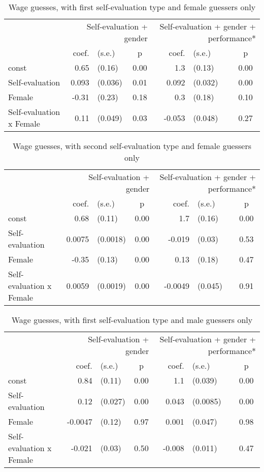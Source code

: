 \begin{table}
\centering
\caption{Wage guesses, with first self-evaluation type and female guessers only}
\begin{tabular}{lrlc|rlc}
\toprule
 & \multicolumn{3}{p{12em}}{Self-evaluation + gender} & \multicolumn{3}{p{12em}}{Self-evaluation + gender + performance*} \\
 & coef. & (s.e.) & p & coef. & (s.e.) & p \\
\midrule
const & 0.65 & (0.16) & 0.00 & 1.3 & (0.13) & 0.00 \\
Self-evaluation & 0.093 & (0.036) & 0.01 & 0.092 & (0.032) & 0.00 \\
Female & -0.31 & (0.23) & 0.18 & 0.3 & (0.18) & 0.10 \\
Self-evaluation x Female & 0.11 & (0.049) & 0.03 & -0.053 & (0.048) & 0.27 \\
\bottomrule
\end{tabular}
\end{table}

\begin{table}
\centering
\caption{Wage guesses, with second self-evaluation type and female guessers only}
\begin{tabular}{lrlc|rlc}
\toprule
 & \multicolumn{3}{p{12em}}{Self-evaluation + gender} & \multicolumn{3}{p{12em}}{Self-evaluation + gender + performance*} \\
 & coef. & (s.e.) & p & coef. & (s.e.) & p \\
\midrule
const & 0.68 & (0.11) & 0.00 & 1.7 & (0.16) & 0.00 \\
Self-evaluation & 0.0075 & (0.0018) & 0.00 & -0.019 & (0.03) & 0.53 \\
Female & -0.35 & (0.13) & 0.00 & 0.13 & (0.18) & 0.47 \\
Self-evaluation x Female & 0.0059 & (0.0019) & 0.00 & -0.0049 & (0.045) & 0.91 \\
\bottomrule
\end{tabular}
\end{table}

\begin{table}
\centering
\caption{Wage guesses, with first self-evaluation type and male guessers only}
\begin{tabular}{lrlc|rlc}
\toprule
 & \multicolumn{3}{p{12em}}{Self-evaluation + gender} & \multicolumn{3}{p{12em}}{Self-evaluation + gender + performance*} \\
 & coef. & (s.e.) & p & coef. & (s.e.) & p \\
\midrule
const & 0.84 & (0.11) & 0.00 & 1.1 & (0.039) & 0.00 \\
Self-evaluation & 0.12 & (0.027) & 0.00 & 0.043 & (0.0085) & 0.00 \\
Female & -0.0047 & (0.12) & 0.97 & 0.001 & (0.047) & 0.98 \\
Self-evaluation x Female & -0.021 & (0.03) & 0.50 & -0.008 & (0.011) & 0.47 \\
\bottomrule
\end{tabular}
\end{table}

